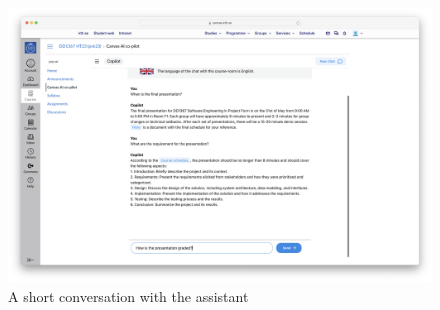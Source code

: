 \begin{figure}[H]
    \centering
    \includegraphics[width=\textwidth]{content/figures/assets/19-a-conversation-with-the-assistant.png}
    \caption{A short conversation with the assistant}
    \label{fig:conversation_with_assistant}
\end{figure}
